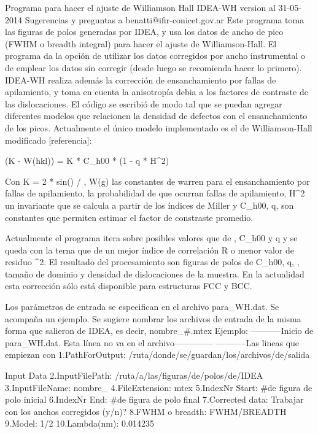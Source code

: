 Programa para hacer el ajuste de Williamson Hall IDEA-WH version al 31-05-2014
Sugerencias y preguntas a benatti@ifir-conicet.gov.ar
Este programa toma las figuras de polos generadas por IDEA, y usa los datos de ancho de pico (FWHM o breadth integral) para hacer el ajuste de Williamson-Hall.
El programa da la opción de utilizar los datos corregidos por ancho instrumental o de emplear los datos sin corregir (desde luego se recomienda hacer lo primero).
IDEA-WH realiza además la corrección de ensanchamiento por fallas de apilamiento, y toma en cuenta la anisotropía debia a los factores de contraste de las dislocaciones.
El código se escribió de modo tal que se puedan agregar diferentes modelos que relacionen la densidad de defectos con el ensanchamiento de los picos. 
Actualmente el único modelo implementado es el de Williamson-Hall modificado [referencia]:

(\Delta K - \delta * W(hkl)) = K * C_{h00} * (1 - q * H^2)

Con K = 2 * sin(\theta) / \lambda, W(g) las constantes de warren para el ensanchamiento por fallas de apilamiento, \delta la probabilidad de que ocurran fallas de apilamiento, H^2 un invariante que se calcula a partir de los índices de Miller y  C_{h00}, q, son constantes que permiten estimar el factor de constraste promedio.

Actualmente el programa itera sobre posibles valores que de \delta, C_{h00} y q y se queda con la terna que de un mejor índice de correlación R o menor valor de residuo \chi^2.
El resultado del procesamiento son figuras de polos de C_{h00}, q, \delta, tamaño de dominio y densidad de dislocaciones de la muestra. En la actualidad esta corrección sólo está disponible para estructuras FCC y BCC.

Los parámetros de entrada se especifican en el archivo para_WH.dat. Se acompaña un ejemplo. Se sugiere nombrar los archivos de entrada de la misma forma que salieron de IDEA, es decir, nombre_#.mtex
Ejemplo:
-----------Inicio de para_WH.dat. Esta línea no va en el archivo--------------
-----------Las lineas que empiezan con %
1.PathForOutput: /ruta/donde/se/guardan/los/archivos/de/salida

Input Data
2.InputFilePath: /ruta/a/las/figuras/de/polos/de/IDEA
3.InputFileName: nombre_
4.FileExtension: mtex
5.IndexNr Start:  #de figura de polo inicial
6.IndexNr End:    #de figura de polo final
7.Corrected data: Trabajar con los anchos corregidos (y/n)?
8.FWHM o breadth: FWHM/BREADTH
9.Model:          1/2
10.Lambda(nm):    0.014235

